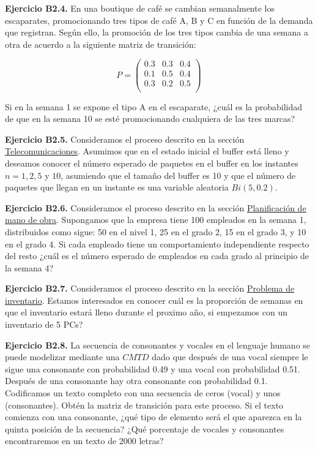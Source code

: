 \documentclass[
]{book}
\theoremstyle{definition}
\theoremstyle{definition}
\theoremstyle{definition}
\theoremstyle{definition}
\theoremstyle{remark}
\begin{document}
\textbf{Ejercicio B2.4.} En una boutique de café se cambian semanalmente los escaparates, promocionando tres tipos de café A, B y C en función de la demanda que registran. Según ello, la promoción de los tres tipos cambia de una semana a otra de acuerdo a la siguiente matriz de transición:

\[P = 
\begin{pmatrix}
0.3 & 0.3 & 0.4\\
0.1 & 0.5 & 0.4\\
0.3 & 0.2 & 0.5\\
\end{pmatrix}\]

Si en la semana 1 se expone el tipo A en el escaparate, ¿cuál es la probabilidad de que en la semana 10 se esté promocionando cualquiera de las tres marcas?

\textbf{Ejercicio B2.5.} Consideramos el proceso descrito en la sección \protect\hyperlink{telecomunicaciones}{Telecomunicaciones}. Asumimos que en el estado inicial el buffer está lleno y deseamos conocer el número esperado de paquetes en el buffer en los instantes \(n =1, 2, 5\) y \(10\), asumiendo que el tamaño del buffer es 10 y que el número de paquetes que llegan en un instante es una variable aleatoria \(Bi(5, 0.2).\)

\textbf{Ejercicio B2.6.} Consideramos el proceso descrito en la sección \protect\hyperlink{planificacion}{Planificación de mano de obra}. Supongamos que la empresa tiene 100 empleados en la semana 1, distribuidos como sigue: 50 en el nivel 1, 25 en el grado 2, 15 en el grado 3, y 10 en el grado 4. Si cada empleado tiene un comportamiento independiente respecto del resto ¿cuál es el número esperado de empleados en cada grado al principio de la semana 4?

\textbf{Ejercicio B2.7.} Consideramos el proceso descrito en la sección \protect\hyperlink{inventario}{Problema de inventario}. Estamos interesados en conocer cuál es la proporción de semanas en que el inventario estará lleno durante el proximo año, si empezamos con un inventario de 5 PCs?

\textbf{Ejercicio B2.8.} La secuencia de consonantes y vocales en el lenguaje humano se puede modelizar mediante una \(CMTD\) dado que después de una vocal siempre le sigue una consonante con probabilidad 0.49 y una vocal con probabilidad 0.51. Después de una consonante hay otra consonante con probabilidad 0.1. Codificamos un texto completo con una secuencia de ceros (vocal) y unos (consonantes). Obtén la matriz de transición para este proceso. Si el texto comienza con una consonante, ¿qué tipo de elemento será el que aparezca en la quinta posición de la secuencia? ¿Qué porcentaje de vocales y consonantes encontraremos en un texto de 2000 letras?
\end{document}
